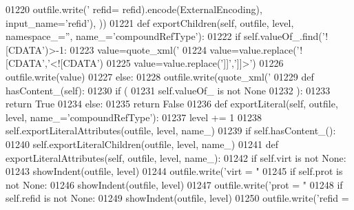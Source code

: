 \begin{DoxyCode}
{{{{{{{{{{{{{{{{{{{{{{{{{{{{{{{{{{{{{{{{{{{{{{{{{{{{{{{{{{{{{{{{{01220             outfile.write(\textcolor{stringliteral}{' refid=%
      refid).encode(ExternalEncoding), input\_name=\textcolor{stringliteral}{'refid'}), ))
01221     \textcolor{keyword}{def }exportChildren(self, outfile, level, namespace\_='', name\_='compoundRefType'):
01222         \textcolor{keywordflow}{if} self.valueOf\_.find(\textcolor{stringliteral}{'![CDATA'})>-1:
01223             value=quote_xml(\textcolor{stringliteral}{'%
01224             value=value.replace(\textcolor{stringliteral}{'![CDATA'},\textcolor{stringliteral}{'<![CDATA'})
01225             value=value.replace(\textcolor{stringliteral}{']]'},\textcolor{stringliteral}{']]>'})
01226             outfile.write(value)
01227         \textcolor{keywordflow}{else}:
01228             outfile.write(quote_xml(\textcolor{stringliteral}{'%
01229     \textcolor{keyword}{def }hasContent_(self):
01230         \textcolor{keywordflow}{if} (
01231             self.valueOf_ \textcolor{keywordflow}{is} \textcolor{keywordflow}{not} \textcolor{keywordtype}{None}
01232             ):
01233             \textcolor{keywordflow}{return} \textcolor{keyword}{True}
01234         \textcolor{keywordflow}{else}:
01235             \textcolor{keywordflow}{return} \textcolor{keyword}{False}
01236     \textcolor{keyword}{def }exportLiteral(self, outfile, level, name\_='compoundRefType'):
01237         level += 1
01238         self.exportLiteralAttributes(outfile, level, name\_)
01239         \textcolor{keywordflow}{if} self.hasContent_():
01240             self.exportLiteralChildren(outfile, level, name\_)
01241     \textcolor{keyword}{def }exportLiteralAttributes(self, outfile, level, name\_):
01242         \textcolor{keywordflow}{if} self.virt \textcolor{keywordflow}{is} \textcolor{keywordflow}{not} \textcolor{keywordtype}{None}:
01243             showIndent(outfile, level)
01244             outfile.write(\textcolor{stringliteral}{'virt = "%
01245         \textcolor{keywordflow}{if} self.prot \textcolor{keywordflow}{is} \textcolor{keywordflow}{not} \textcolor{keywordtype}{None}:
01246             showIndent(outfile, level)
01247             outfile.write(\textcolor{stringliteral}{'prot = "%
01248         \textcolor{keywordflow}{if} self.refid \textcolor{keywordflow}{is} \textcolor{keywordflow}{not} \textcolor{keywordtype}{None}:
01249             showIndent(outfile, level)
01250             outfile.write(\textcolor{stringliteral}{'refid = %
}}}}}}}}}}}}}}}}}}}}}}}}}}}}}}}}}}}}}}}}}}}}}}}}}}}}}}}}}}}}}}}}}}}}}}}
\end{DoxyCode}

